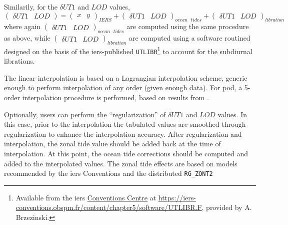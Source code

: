 Similarily, for the $\delta UT1$ and $LOD$ values, 
\begin{equation}
    \begin{pmatrix} \delta UT1 & LOD \end{pmatrix} = 
    \begin{pmatrix} x & y \end{pmatrix}_{IERS} + 
    \begin{pmatrix} \delta UT1 & LOD  \end{pmatrix}_{ocean\text{ }tides} + 
    \begin{pmatrix} \delta UT1 & LOD  \end{pmatrix}_{libration} 
\end{equation}
where again $\begin{pmatrix} \delta UT1 & LOD  \end{pmatrix}_{ocean\text{ }tides}$ 
are computed using the same procedure as above, while $\begin{pmatrix} \delta UT1 & LOD  \end{pmatrix}_{libration}$ 
are computed using a software routined designed on the basis of the \gls{iers}-published 
\texttt{UTLIBR}\footnote{Available from the \gls{iers} \href{https://iers-conventions.obspm.fr/}{Conventions Centre} at \url{https://iers-conventions.obspm.fr/content/chapter5/software/UTLIBR.F}, provided by A. Brzezinski.\label{fn:utlibr-f}} 
to account for the subdiurnal librations.

The linear interpolation is based on a Lagrangian interpolation scheme, generic enough to 
perform interpolation of any order (given enough data). For \gls{pod}, a 5-order 
interpolation procedure is performed, based on results from \cite{Bradley2016}. 

Optionally, users can perform the ``regularization'' of $\delta UT1$ and $LOD$ values. 
In this case, prior to the interpolation the tabulated values are smoothed through 
regularization to enhance the interpolation accuracy. After regularization and 
interpolation, the zonal tide value should be added back at the time of interpolation.
At this point, the ocean tide corrections should be computed and added to the 
interpolated values. The zonal tide effects are based on models recommended by 
the \gls{iers} Conventions and the distributed \texttt{RG\_ZONT2}

